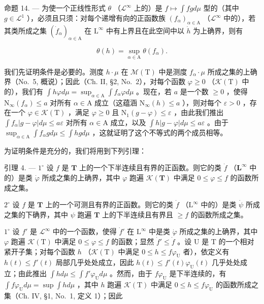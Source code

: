 命题 14. --- 为使一个正线性形式 \(\theta\) （\(\mathcal{L}^{\infty}\) 上的）是 \(f \mapsto \int fg d\mu\) 型的（其中 \(g \in \mathcal{L}^{1}\) ），必须且只须：对每个递增有向的正函数族 \((f_{\alpha})_{\alpha \in \mathrm{A}}\) （\(\mathcal{L}^{\infty}\) 中的），若其类所成之集 \((\dot{f}_{\alpha})_{\alpha \in \mathrm{A}}\) 在 \(\mathrm{L}^{\infty}\) 中有上界且在此空间中以 \(\dot{h}\) 为上确界，则有

\[
\theta (h) = \sup _ {\alpha \in \mathrm{A}} \theta (f _ {\alpha}).
\]

我们先证明条件是必要的。测度 \(h \cdot \mu\) 在 \(\mathcal{M}(\mathrm{T})\) 中是测度 \(f_{\alpha} \cdot \mu\) 所成之集的上确界（No.~5, 概说）；因此（Ch. II, §2, No.~2），对每个函数 \(\varphi \geqslant 0\) （\(\mathcal{K}(\mathrm{T})\) 中的），我们有 \(\int h\varphi d\mu = \sup_{\alpha \in \mathrm{A}} \int f_{\alpha}\varphi d\mu\) 。现在，若 \(a\) 是一个数 \(\geqslant 0\) ，使得 \(\mathrm{N}_{\infty}(f_{\alpha}) \leqslant a\) 对所有 \(\alpha \in \mathrm{A}\) 成立（这蕴涵 \(\mathrm{N}_{\infty}(h) \leqslant a\) ），则对每个 \(\varepsilon > 0\) ，存在一个 \(\varphi \in \mathcal{K}(\mathrm{T})\) ，满足 \(\varphi \geqslant 0\) 且 \(\mathrm{N}_1(g - \varphi) \leqslant \varepsilon\) ，由此我们推出 \(\int f_{\alpha}|g - \varphi| d\mu \leqslant a\varepsilon\) 对所有 \(\alpha \in \mathrm{A}\) 成立，以及 \(\int h|g - \varphi| d\mu \leqslant a\varepsilon\) 。由于 \(\sup_{\alpha \in \mathrm{A}} \int f_{\alpha}g d\mu \leqslant \int hg d\mu\) ，这就证明了这个不等式的两个成员相等。

为证明条件是充分的，我们将用到下列引理：

引理 4. --- \(1^{\circ}\) 设 \(f\) 是 \(\mathbf{T}\) 上的一个下半连续且有界的正函数。则它的类 \(\dot{f}\) （\(\mathbf{L}^{\infty}\) 中的）是类 \(\dot{\varphi}\) 所成之集的上确界，其中 \(\varphi\) 跑遍 \(\mathcal{K}(\mathbf{T})\) 中满足 \(0 \leqslant \varphi \leqslant f\) 的函数所成之集。

\(2^{\circ}\) 设 \(f\) 是 \(\mathbf{T}\) 上的一个可测且有界的正函数。则它的类 \(\dot{f}\) （\(\mathrm{L}^{\infty}\) 中的）是类 \(\dot{\psi}\) 所成之集的下确界，其中 \(\psi\) 跑遍 \(\mathbf{T}\) 上的下半连续且有界且 \(\geqslant f\) 的函数所成之集。

\(1^{\circ}\) 设 \(f'\) 是 \(\mathcal{L}^{\infty}\) 中的一个函数，使得 \(\dot{f}'\) 在 \(\mathrm{L}^{\infty}\) 中是类 \(\dot{\varphi}\) 所成之集的上确界，其中 \(\varphi\) 跑遍 \(\mathcal{K}(\mathrm{T})\) 中满足 \(0 \leqslant \varphi \leqslant f\) 的函数；显然 \(\dot{f}' \leqslant \dot{f}\) 。设 U 是 T 的一个相对紧开子集；对每个函数 \(h\) （\(\mathcal{K}(\mathrm{T})\) 中满足 \(0 \leqslant h \leqslant f\varphi_{\mathrm{U}}\) 者），依定义有 \(h(t) \leqslant f'(t)\) 局部几乎处处成立，因此 \(h(t) \leqslant f'(t)\varphi_{\mathrm{U}}(t)\) 几乎处处成立；由此推出 \(\int h d\mu \leqslant \int f'\varphi_{\mathrm{U}} d\mu\) 。然而，由于 \(f\varphi_{\mathrm{U}}\) 是下半连续的，有 \(\int f\varphi_{\mathrm{U}} d\mu = \sup \int h d\mu\) ，其中 \(h\) 跑遍 \(\mathcal{K}(\mathrm{T})\) 中满足 \(0 \leqslant h \leqslant f\varphi_{\mathrm{U}}\) 的函数所成之集（Ch. IV, §1, No.~1, 定义 1）；因此

